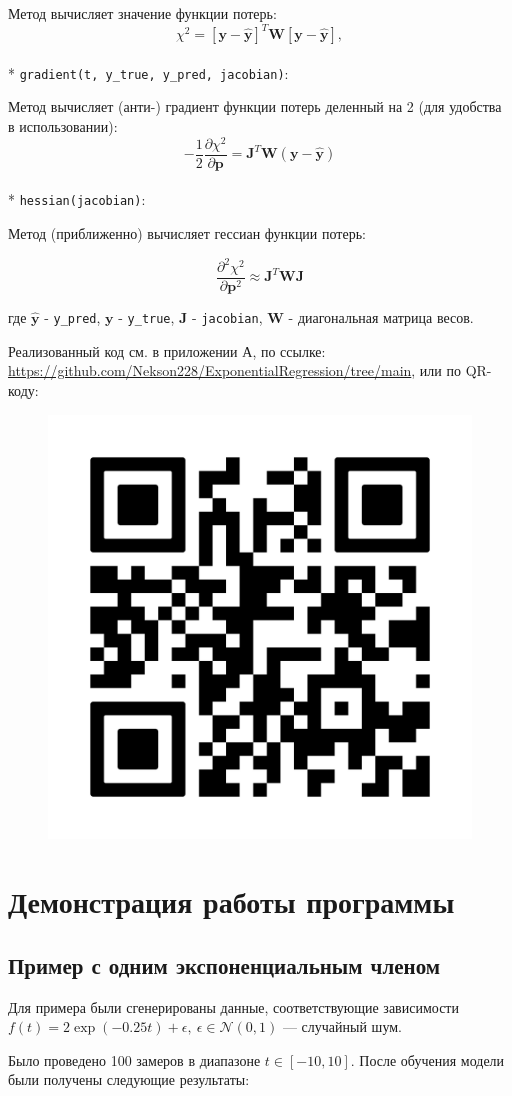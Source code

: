 Метод вычисляет значение функции потерь:
\[
	\chi^2 = \left[\mathbf y - \mathbf{\hat{y}}\right ]^T\mathbf{W}\left[\mathbf y - \mathbf{\hat{y}}\right ],
\]
\\*
\texttt{gradient(t, y\_true, y\_pred, jacobian)}:

Метод вычисляет (анти-) градиент функции потерь деленный на 2 (для удобства в использовании):
\[
	-\frac{1}{2}\frac{\partial\chi^2}{\partial\mathbf{p}} = \mathbf{J}^T\mathbf{W}(\mathbf{y}-\mathbf{\hat{y}})
\]
\\*
\texttt{hessian(jacobian)}:

Метод (приближенно) вычисляет гессиан функции потерь:

\[
	\frac{\partial^2\chi^2}{\partial\mathbf{p}^2} \approx \mathbf{J}^T\mathbf{W}\mathbf{J}
\]

где $\mathbf{\hat{y}}$ - \texttt{y\_pred},  $\mathbf{y}$ - \texttt{y\_true}, $\mathbf{J}$ - \texttt{jacobian}, $\mathbf{W}$ - диагональная матрица весов.

Реализованный код см. в приложении А, по ссылке: \url{https://github.com/Nekson228/ExponentialRegression/tree/main}, или по QR-коду:

\begin{figure}[h!]
	\centering
	\includegraphics[width=0.2\linewidth]{../img/qr.png}
\end{figure}


\newpage
\section{Демонстрация работы программы}
\subsection{Пример с одним экспоненциальным членом}

Для примера были сгенерированы данные, соответствующие зависимости $f(t)=2\exp(-0.25t) + \epsilon,\:\epsilon\in\mathcal{N}(0, 1)$ — случайный шум.

Было проведено 100 замеров в диапазоне $t\in[-10, 10]$. После обучения модели были получены следующие результаты:

